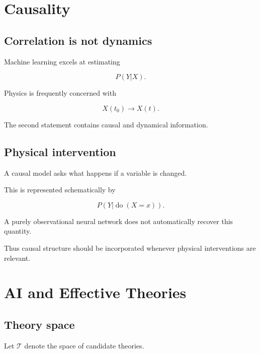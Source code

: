 \documentclass[11pt,a4paper,oneside]{book}
\begin{document}
\chapter{Causality}

\section{Correlation is not dynamics}

Machine learning excels at estimating

\begin{equation}
P(Y|X).
\end{equation}

Physics is frequently concerned with

\begin{equation}
X(t_0)\longrightarrow X(t).
\end{equation}

The second statement contains causal and dynamical information.

\section{Physical intervention}

A causal model asks what happens if a variable is changed.

This is represented schematically by

\begin{equation}
P(Y|\operatorname{do}(X=x)).
\end{equation}

A purely observational neural network does not automatically recover this
quantity.

Thus causal structure should be incorporated whenever physical interventions
are relevant.

\chapter{AI and Effective Theories}

\section{Theory space}

Let $\mathcal{T}$ denote the space of candidate theories.
\end{document}
